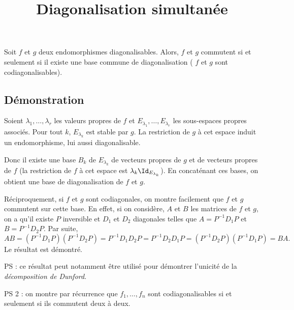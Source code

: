 \documentclass[fontsize=12pt,twoside=false,parskip=half]{scrartcl}
\title{Diagonalisation simultanée}
\date{}
\author{}
\begin{document}
\maketitle
   \begin{Theoreme}
      Soit $f$ et $g$ deux endomorphismes diagonalisables. Alors, $f$ et $g$ commutent si et seulement si il existe une base commune de diagonalisation (\ie{} $f$ et $g$ sont codiagonalisables). 
   \end{Theoreme}
   \subsection{Démonstration}
      Soient $\lambda_1, \ldots, \lambda_r$ les valeurs propres de $f$ et $E_{\lambda_1}, \ldots, E_{\lambda_r}$ 
      les sous-espaces propres associés. Pour tout $k$, $E_{\lambda_k}$ est stable par $g$. La restriction
      de $g$ à cet espace induit un endomorphisme, lui aussi diagonalisable. 
      
      Donc il existe une base $B_k$ de $E_{\lambda_k}$ de vecteurs propres de $g$ et de vecteurs propres de $f$ 
      (la restriction de $f$ à cet espace est $\lambda_k \Id_{E_{\lambda_k}}$). En concaténant ces bases, on obtient une base de diagonalisation de $f$ et $g$.
      
      Réciproquement, si $f$ et $g$ sont codiagonales, on montre facilement que $f$ et $g$ commutent sur cette
      base. En effet, si on considère, $A$ et $B$ les matrices de $f$ et $g$, on a qu’il existe $P$ inversible
      et $D_1$ et $D_2$ diagonales telles que $A = P^{-1}D_1P$ et $B = P^{-1}D_2P$. Par suite,
      \[
         AB = (P^{-1}D_1P)(P^{-1}D_2P) = P^{-1}D_1D_2P = P^{-1}D_2D_1P = (P^{-1}D_2P)(P^{-1}D_1P) = BA.
      \]
      Le résultat est démontré.
      
      PS : ce résultat peut notamment être utilisé pour démontrer l’unicité de la \emph{décomposition de Dunford}.
      
      PS 2 : on montre par récurrence que $f_1, \ldots, f_n$ sont codiagonalisables si et seulement si ils commutent deux à deux.
\end{document}
